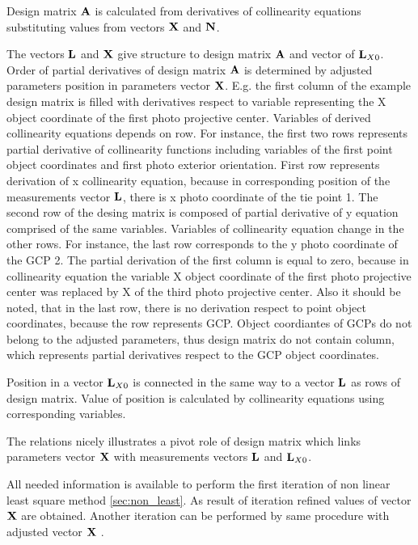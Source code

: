 \documentclass[a4paper,12pt]{article}
\newcommand{\evect}[1]{
{\bf #1}
}
\begin{document}
Design matrix $\evect{A}$ is calculated from 
derivatives of collinearity equations substituting values from vectors $\evect{X}$ and $\evect{N}$.

The vectors  $\evect{L}$ and  $\evect{X}$ give structure to design matrix $\evect{A}$ and
vector of $\evect{L}_{X0}$.
Order of partial derivatives of design matrix $\evect{A}$  is determined by adjusted parameters position in 
parameters vector $\evect{X}$. E.g. the first column of the example design matrix is filled with derivatives respect 
to variable representing the  X object coordinate of the first photo projective center. Variables of derived collinearity equations
depends on row. For instance, the first two rows represents partial derivative of collinearity functions 
including variables of the first point object coordinates  and first photo exterior orientation.  First row represents  
derivation of x collinearity equation, because in corresponding position of the measurements vector $\evect{L}$, there is 
x photo coordinate of the tie point 1. The second row of the desing matrix is composed of 
partial derivative of y equation comprised of the same variables. 
Variables of collinearity equation change in the other rows. For instance, the last row corresponds to the 
y photo coordinate of the GCP 2. The partial derivation of the first column is equal 
to zero, because in collinearity equation the variable X object coordinate of the first photo projective center was replaced 
by X of the third photo projective center. Also it should be noted, that in the last row, there is no derivation 
respect to point object coordinates, because the row represents GCP. Object coordiantes of GCPs do not 
belong to the adjusted parameters, thus design matrix do not contain column, which represents partial 
derivatives respect to the GCP object coordinates.


Position in a vector $\evect{L}_{X0}$ is connected in the same way to a vector $\evect{L}$ as rows of design matrix.
Value of position is calculated by collinearity equations using corresponding variables.



The relations nicely illustrates a pivot role of design matrix which links parameters vector $\evect{X}$ 
with measurements vectors $\evect{L}$ and $\evect{L}_{X0}$.

All needed information is available to perform the first iteration of non linear least square 
method \ref{sec:non_least}. As result of iteration refined values of vector  $\evect{X}$
are obtained. Another iteration can be  performed by same procedure  with adjusted vector $\evect{X}$
.
\end{document}
